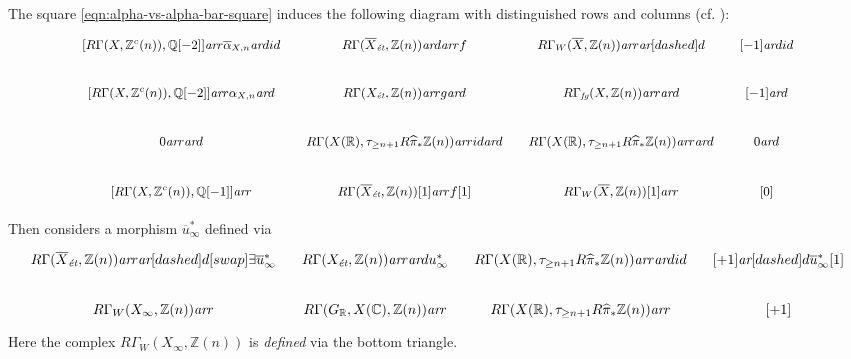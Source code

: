 \documentclass[leqno,12pt]{article}
\theoremstyle{plain}
\theoremstyle{definition}
\newcommand{\CC}{\mathbb{C}}
\newcommand{\QQ}{\mathbb{Q}}
\newcommand{\RR}{\mathbb{R}}
\newcommand{\ZZ}{\mathbb{Z}}
\newcommand{\ar}{\text{\it ar}}
\newcommand{\et}{\text{\it \'{e}t}}
\newcommand{\fg}{\text{\it fg}}
\begin{document}
The square \eqref{eqn:alpha-vs-alpha-bar-square} induces the following diagram
with distinguished rows and columns (cf. \cite[Proposition~1.4.6]{Neeman-2001}):
\begin{equation}
  \label{eqn:cones-of-alphas}
  \begin{tikzcd}[column sep=1em,font=\small]
    {[R\Gamma (X, \ZZ^c (n)), \QQ [-2]]} \ar{r}{\overline{\alpha}_{X,n}}\ar{d}{id} & R\Gamma (\overline{X}_\et, \ZZ(n))\ar{d}\ar{r}{f} & R\Gamma_W (\overline{X}, \ZZ(n)) \ar{r}\ar[dashed]{d} & {[-1]}\ar{d}{id} \\
    {[R\Gamma (X, \ZZ^c (n)), \QQ [-2]]} \ar{r}{\alpha_{X,n}}\ar{d} & R\Gamma (X_\et, \ZZ(n)) \ar{r}{g}\ar{d} & R\Gamma_\fg (X, \ZZ(n)) \ar{r}\ar{d} & {[-1]}\ar{d} \\
    0\ar{r}\ar{d} & R\Gamma (X (\RR), \tau_{\ge n+1} R \widehat{\pi}_* \ZZ (n)) \ar{r}{id}\ar{d} & R\Gamma (X (\RR), \tau_{\ge n+1} R \widehat{\pi}_* \ZZ (n)) \ar{r}\ar{d} & 0\ar{d} \\
    {[R\Gamma (X, \ZZ^c (n)), \QQ [-1]]} \ar{r} & R\Gamma (\overline{X}_\et, \ZZ(n))[1]\ar{r}{f[1]} & R\Gamma_W (\overline{X}, \ZZ(n))[1] \ar{r} & {[0]}
  \end{tikzcd}
\end{equation}


Then \cite[Definition~3.23]{Flach-Morin-2018} considers a morphism
$\overline{u}^*_\infty$ defined via
\begin{equation}
  \label{eqn:definition-of-u-bar-infty}
  \begin{tikzcd}[column sep=1em]
    R\Gamma (\overline{X}_\et, \ZZ(n)) \ar{r}\ar[dashed]{d}[swap]{\exists}{\overline{u}_\infty^*} & R\Gamma (X_\et, \ZZ(n)) \ar{r}\ar{d}{u_\infty^*} & R\Gamma (X(\RR), \tau_{\ge n+1} R \widehat{\pi}_* \ZZ (n)) \ar{r}\ar{d}{id} & {[+1]} \ar[dashed]{d}{\overline{u}_\infty^* [1]} \\
    R\Gamma_W (X_\infty, \ZZ (n)) \ar{r} & R\Gamma (G_\RR, X (\CC), \ZZ (n)) \ar{r} & R\Gamma (X(\RR), \tau_{\ge n+1} R \widehat{\pi}_* \ZZ (n)) \ar{r} & {[+1]}
  \end{tikzcd}
\end{equation}
Here the complex $R\Gamma_W (X_\infty, \ZZ(n))$ is \emph{defined} via the bottom
triangle.
\end{document}

